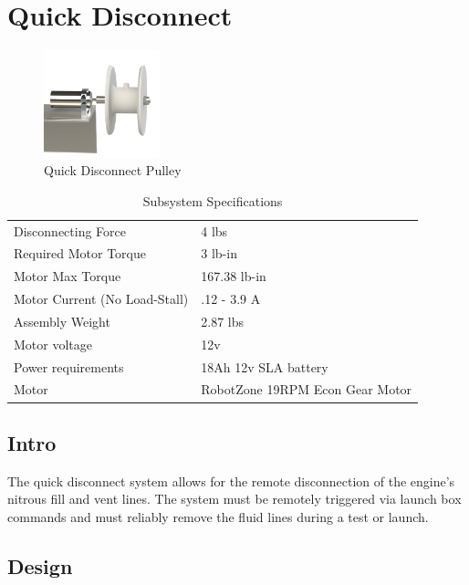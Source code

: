 \documentclass[10pt,a4paper]{article}
\begin{document}
	
\section{Quick Disconnect}

\begin{figure}[h!]
	\centering
	\includegraphics[width=0.3\textwidth]{./figs/qd_main.jpg}
	\caption{Quick Disconnect Pulley}
	\label{fig:qd_main}
\end{figure}


\begin{table}[h!]
		\centering
		\begin{tabular}{l l }
			Disconnecting Force & 4 lbs \\
			Required Motor Torque & 3 lb-in \\
			Motor Max Torque & 167.38 lb-in\\
			Motor Current (No Load-Stall) & .12 - 3.9 A\\
			Assembly Weight & 2.87 lbs \\
			Motor voltage & 12v\\
			Power requirements & 18Ah 12v SLA battery\\
			Motor & RobotZone 19RPM Econ Gear Motor\\
			
			
		\end{tabular}
		\caption{Subsystem Specifications}
		\label{tab:example}
\end{table} 
\subsection{Intro}
The quick disconnect system allows for the remote disconnection of the engine's nitrous fill and vent lines. The system must be remotely triggered via launch box commands and must reliably remove the fluid lines during a test or launch. 
\subsection{Design}
\end{document}
